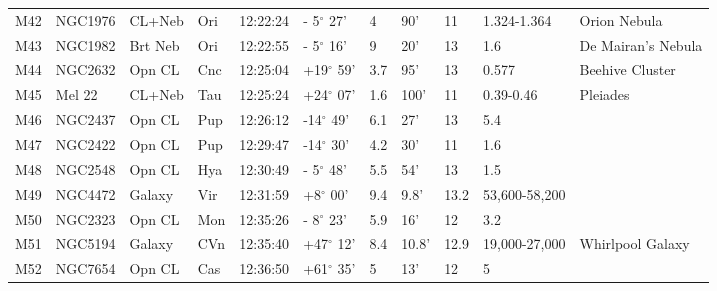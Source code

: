 \begin{longtable}{@{}lllllllllll@{}}
M42        & NGC1976     & CL+Neb     & Ori       & 12:22:24 & - 5$^{\circ}$ 27'  & 4         & 90'                  & 11       & 1.324-1.364         & Orion Nebula                              \\
M43        & NGC1982     & Brt Neb    & Ori       & 12:22:55 & - 5$^{\circ}$ 16'  & 9         & 20'                  & 13       & 1.6                 & De Mairan's Nebula                        \\
M44        & NGC2632     & Opn CL     & Cnc       & 12:25:04 & +19$^{\circ}$ 59'  & 3.7       & 95'                  & 13       & 0.577               & Beehive Cluster                           \\
M45        & Mel 22      & CL+Neb     & Tau       & 12:25:24 & +24$^{\circ}$ 07'  & 1.6       & 100'                 & 11       & 0.39-0.46           & Pleiades                                  \\
M46        & NGC2437     & Opn CL     & Pup       & 12:26:12 & -14$^{\circ}$ 49'  & 6.1       & 27'                  & 13       & 5.4                 &                                           \\
M47        & NGC2422     & Opn CL     & Pup       & 12:29:47 & -14$^{\circ}$ 30'  & 4.2       & 30'                  & 11       & 1.6                 &                                           \\
M48        & NGC2548     & Opn CL     & Hya       & 12:30:49 & - 5$^{\circ}$ 48'  & 5.5       & 54'                  & 13       & 1.5                 &                                           \\
M49        & NGC4472     & Galaxy     & Vir       & 12:31:59 & +8$^{\circ}$ 00'   & 9.4       & 9.8'                 & 13.2     & 53,600-58,200       &                                           \\
M50        & NGC2323     & Opn CL     & Mon       & 12:35:26 & - 8$^{\circ}$ 23'  & 5.9       & 16'                  & 12       & 3.2                 &                                           \\
M51        & NGC5194     & Galaxy     & CVn       & 12:35:40 & +47$^{\circ}$ 12'  & 8.4       & 10.8'                & 12.9     & 19,000-27,000       & Whirlpool Galaxy                          \\
M52        & NGC7654     & Opn CL     & Cas       & 12:36:50 & +61$^{\circ}$ 35'  & 5         & 13'                  & 12       & 5                   &                                           \\

\end{longtable}
